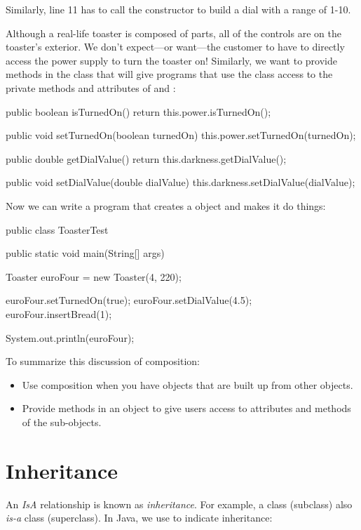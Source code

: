 Similarly, line 11 has to call the  constructor to build a dial with a range of 1-10.

Although a real-life toaster is composed of parts, all of the controls are on the toaster's exterior. We don't expect---or want---the customer to have to directly access the power supply to turn the toaster on! Similarly, we want to provide methods in the  class that will give programs that use the class access to the private methods and attributes of  and :

\begin{code}
public boolean isTurnedOn() {
    return this.power.isTurnedOn();
}

public void setTurnedOn(boolean turnedOn) {
    this.power.setTurnedOn(turnedOn);
}

public double getDialValue() {
    return this.darkness.getDialValue();
}

public void setDialValue(double dialValue) {
    this.darkness.setDialValue(dialValue);
}
\end{code}

Now we can write a program that creates a  object and makes it do things:

\begin{code}
public class ToasterTest {
    public static void main(String[] args) {
        Toaster euroFour = new Toaster(4, 220);
       
        euroFour.setTurnedOn(true);
        euroFour.setDialValue(4.5);
        euroFour.insertBread(1);
        
        System.out.println(euroFour);
    }
}
\end{code}

To summarize this discussion of composition:

\begin{itemize}
\item Use composition when you have objects that are built up from other objects.
\item Provide methods in an object to give users access to  attributes and methods of the sub-objects.
\end{itemize}

\section{Inheritance}
An {\em Is\-A} relationship is known as {\em inheritance}. For example, a  class (subclass) also {\em is-a}  class (superclass). In Java, we use  to indicate inheritance:

